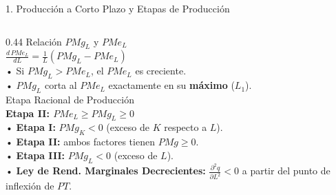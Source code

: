 \documentclass[aspectratio=169, 10pt]{beamer}
\begin{document}
\begin{frame}{1. Producción a Corto Plazo y Etapas de Producción}
\begin{columns}[T]
    \begin{column}{0.44\textwidth}
      {\scriptsize\color{grisTexto}Relación \(PMg_L\) y \(PMe_L\)}\\[1pt]
      {\large\color{azulPrincipal}\textbf{\(\frac{d\,PMe_L}{dL} = \frac{1}{L}(PMg_L - PMe_L)\)}}\\[5pt]
      {\scriptsize
        • Si \(PMg_L > PMe_L\), el \(PMe_L\) es creciente.\\
        • \(PMg_L\) corta al \(PMe_L\) exactamente en su \textbf{máximo} (\(L_1\)).\\[5pt]
      }
      {\scriptsize\color{grisTexto}Etapa Racional de Producción}\\[1pt]
      {\large\color{verdeAcento}\textbf{Etapa II: \(PMe_L \ge PMg_L \ge 0\)}}\\[5pt]
      {\scriptsize
        • \textbf{Etapa I:} \(PMg_K < 0\) (exceso de \(K\) respecto a \(L\)).\\
        • \textbf{Etapa II:} ambos factores tienen \(PMg \ge 0\).\\
        • \textbf{Etapa III:} \(PMg_L < 0\) (exceso de \(L\)).\\
        • \textbf{Ley de Rend. Marginales Decrecientes:} \(\frac{\partial^2 q}{\partial L^2} < 0\) a partir del punto de inflexión de \(PT\).
      }
    \end{column}
  \end{columns}

\end{frame}
\end{document}
